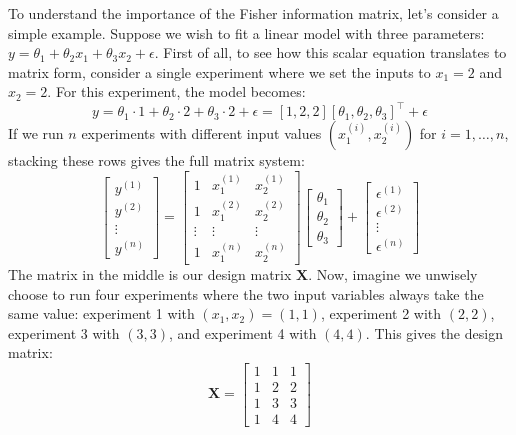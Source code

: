 To understand the importance of the Fisher information matrix, let's consider a simple example. Suppose we wish to fit a linear model with three parameters: $y = \theta_1 + \theta_2 x_1 + \theta_3 x_2 + \epsilon$. First of all, to see how this scalar equation translates to matrix form, consider a single experiment where we set the inputs to $x_1 = 2$ and $x_2 = 2$. For this experiment, the model becomes:
\begin{equation}
    y = \theta_1 \cdot 1 + \theta_2 \cdot 2 + \theta_3 \cdot 2 + \epsilon = [1, 2, 2][\theta_1, \theta_2, \theta_3]^\top + \epsilon
\end{equation}
If we run $n$ experiments with different input values $(x_1^{(i)}, x_2^{(i)})$ for $i = 1, \ldots, n$, stacking these rows gives the full matrix system:
\begin{equation}
    \begin{bmatrix} y^{(1)} \\ y^{(2)} \\ \vdots \\ y^{(n)} \end{bmatrix} = \begin{bmatrix} 1 & x_1^{(1)} & x_2^{(1)} \\ 1 & x_1^{(2)} & x_2^{(2)} \\ \vdots & \vdots & \vdots \\ 1 & x_1^{(n)} & x_2^{(n)} \end{bmatrix} \begin{bmatrix} \theta_1 \\ \theta_2 \\ \theta_3 \end{bmatrix} + \begin{bmatrix} \epsilon^{(1)} \\ \epsilon^{(2)} \\ \vdots \\ \epsilon^{(n)} \end{bmatrix}
\end{equation}
The matrix in the middle is our design matrix $\mathbf{X}$. Now, imagine we unwisely choose to run four experiments where the two input variables always take the same value: experiment 1 with $(x_1, x_2) = (1, 1)$, experiment 2 with $(2, 2)$, experiment 3 with $(3, 3)$, and experiment 4 with $(4, 4)$. This gives the design matrix:
\begin{equation}
    \mathbf{X} = \begin{bmatrix} 1 & 1 & 1 \\ 1 & 2 & 2 \\ 1 & 3 & 3 \\ 1 & 4 & 4 \end{bmatrix}
\end{equation}
